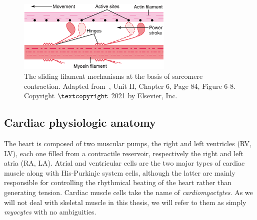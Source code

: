 \begin{figure}[!ht]
    \myfloatalign
    \includegraphics[width=0.66\textwidth]{figures/chapter01/fig_elsv_10.png}
    \caption{The sliding filament mechanisms at the basis of sarcomere contraction. Adapted from~\cite{Guyton:2021}, Unit II, Chapter 6, Page 84, Figure 6-8. Copyright $\textcopyright$ 2021 by Elsevier, Inc.}
    \label{fig:powerstroke}
\end{figure}





%
%
%
\subsection{Cardiac physiologic anatomy}\label{sec:ch1cardiac_physiologic_anatomy}
The heart is composed of two muscular pumps, the right and left ventricles (\acs{RV}, \acs{LV}), each one filled from a contractile reservoir, respectively the right and left atria (\acs{RA}, \acs{LA}). Atrial and ventricular cells are the two major types of cardiac muscle along with His-Purkinje system cells, although the latter are mainly responsible for controlling the rhythmical beating of the heart rather than generating tension. Cardiac muscle cells take the name of \textit{cardiomyoctytes}. As we will not deal with skeletal muscle in this thesis, we will refer to them as simply \textit{myocytes} with no ambiguities.


